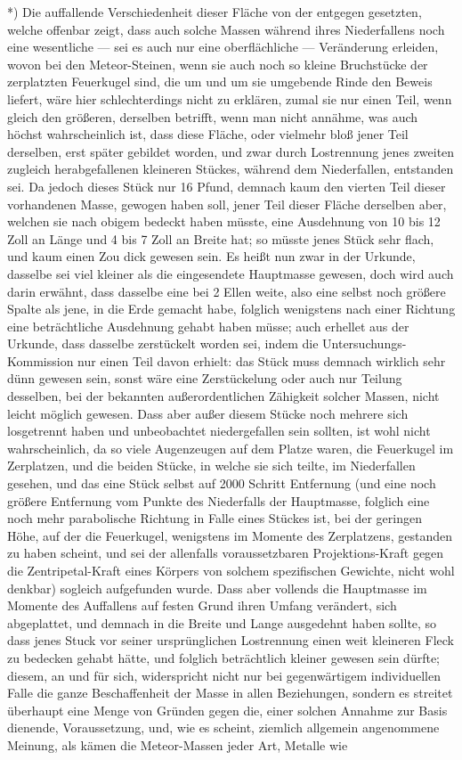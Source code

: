 \documentclass[a4paper, 11pt, oneside, german]{article}
\begin{document}
*) Die auffallende Verschiedenheit dieser Fläche von der entgegen gesetzten, welche offenbar zeigt, dass auch solche Massen während ihres Niederfallens noch eine wesentliche --- sei es auch nur eine oberflächliche --- Veränderung erleiden, wovon bei den Meteor-Steinen, wenn sie auch noch so kleine Bruchstücke der zerplatzten Feuerkugel sind, die um und um sie umgebende Rinde den Beweis liefert, wäre hier schlechterdings nicht zu erklären, zumal sie nur einen Teil, wenn gleich den größeren, derselben betrifft, wenn man nicht annähme, was auch höchst wahrscheinlich ist, dass diese Fläche, oder vielmehr bloß jener Teil derselben, erst später gebildet worden, und zwar durch Lostrennung jenes zweiten zugleich herabgefallenen kleineren Stückes, während dem Niederfallen, entstanden sei. Da jedoch dieses Stück nur 16 Pfund, demnach kaum den vierten Teil dieser vorhandenen Masse, gewogen haben soll, jener Teil dieser Fläche derselben aber, welchen sie nach obigem bedeckt haben müsste, eine Ausdehnung von 10 bis 12 Zoll an Länge und 4 bis 7 Zoll an Breite hat; so müsste jenes Stück sehr flach, und kaum einen Zou dick gewesen sein. Es heißt nun zwar in der Urkunde, dasselbe sei viel kleiner als die eingesendete Hauptmasse gewesen, doch wird auch darin erwähnt, dass dasselbe eine bei 2 Ellen weite, also eine selbst noch größere Spalte als jene, in die Erde gemacht habe, folglich wenigstens nach einer Richtung eine beträchtliche Ausdehnung gehabt haben müsse; auch erhellet aus der Urkunde, dass dasselbe zerstückelt worden sei, indem die Untersuchungs-Kommission nur einen Teil davon erhielt: das Stück muss demnach wirklich sehr dünn gewesen sein, sonst wäre eine Zerstückelung oder auch nur Teilung desselben, bei der bekannten außerordentlichen Zähigkeit solcher Massen, nicht leicht möglich gewesen. Dass aber außer diesem Stücke noch mehrere sich losgetrennt haben und unbeobachtet niedergefallen sein sollten, ist wohl nicht wahrscheinlich, da so viele Augenzeugen auf dem Platze waren, die Feuerkugel im Zerplatzen, und die beiden Stücke, in welche sie sich teilte, im Niederfallen gesehen, und das eine Stück selbst auf 2000 Schritt Entfernung (und eine noch größere Entfernung vom Punkte des Niederfalls der Hauptmasse, folglich eine noch mehr parabolische Richtung in Falle eines Stückes ist, bei der geringen Höhe, auf der die Feuerkugel, wenigstens im Momente des Zerplatzens, gestanden zu haben scheint, und sei der allenfalls voraussetzbaren Projektions-Kraft gegen die Zentripetal-Kraft eines Körpers von solchem spezifischen Gewichte, nicht wohl denkbar) sogleich aufgefunden wurde. Dass aber vollends die Hauptmasse im Momente des Auffallens auf festen Grund ihren Umfang verändert, sich abgeplattet, und demnach in die Breite und Lange ausgedehnt haben sollte, so dass jenes Stuck vor seiner ursprünglichen Lostrennung einen weit kleineren Fleck zu bedecken gehabt hätte, und folglich beträchtlich kleiner gewesen sein dürfte; diesem, an und für sich, widerspricht nicht nur bei gegenwärtigem individuellen Falle die ganze Beschaffenheit der Masse in allen Beziehungen, sondern es streitet überhaupt eine Menge von Gründen gegen die, einer solchen Annahme zur Basis dienende, Voraussetzung, und, wie es scheint, ziemlich allgemein angenommene Meinung, als kämen die Meteor-Massen jeder Art, Metalle wie 
\end{document}
